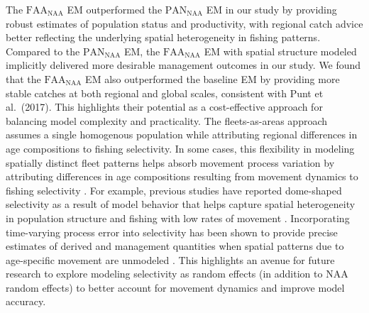 \documentclass[
  12pt,
]{article}
\begin{document}
The \(\text{FAA}_{\scriptscriptstyle \text{NAA}}\) EM outperformed the
\(\text{PAN}_{\scriptscriptstyle \text{NAA}}\) EM in our study by
providing robust estimates of population status and productivity, with
regional catch advice better reflecting the underlying spatial
heterogeneity in fishing patterns. Compared to the
\(\text{PAN}_{\scriptscriptstyle \text{NAA}}\) EM, the
\(\text{FAA}_{\scriptscriptstyle \text{NAA}}\) EM with spatial structure
modeled implicitly delivered more desirable management outcomes in our
study. We found that the \(\text{FAA}_{\scriptscriptstyle \text{NAA}}\)
EM also outperformed the baseline EM by providing more stable catches at
both regional and global scales, consistent with Punt et al.~(2017).
This highlights their potential as a cost-effective approach for
balancing model complexity and practicality. The fleets-as-areas
approach assumes a single homogenous population while attributing
regional differences in age compositions to fishing selectivity. In some
cases, this flexibility in modeling spatially distinct fleet patterns
helps absorb movement process variation by attributing differences in
age compositions resulting from movement dynamics to fishing selectivity
\citep{Cope2011, Berger2012, O'Boyle2016}. For example, previous studies
have reported dome-shaped selectivity as a result of model behavior that
helps capture spatial heterogeneity in population structure and fishing
with low rates of movement \citep{Waterhouse2014}. Incorporating
time-varying process error into selectivity has been shown to provide
precise estimates of derived and management quantities when spatial
patterns due to age-specific movement are unmodeled \citep{Lee2017}.
This highlights an avenue for future research to explore modeling
selectivity as random effects (in addition to NAA random effects) to
better account for movement dynamics and improve model accuracy.
\end{document}

